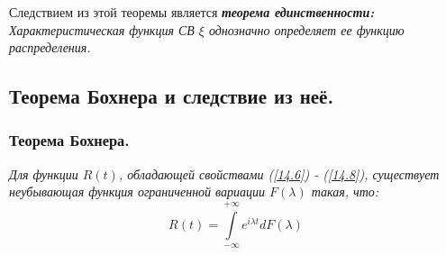     Следствием из этой теоремы является \textit{\textbf{теорема единственности:}}
      \textit{Характеристическая функция СВ $\xi$ однозначно определяет ее функцию распределения.}

  
    \subsection{Теорема Бохнера и следствие из неё.}
    \subsubsection{Теорема Бохнера.}

  \begin{theorem}\label{smd_theor_3} \textit{Для функции $R(t)$, обладающей свойствами (\ref{14.6}) - (\ref{14.8}), существует неубывающая функция ограниченной вариации $F(\lambda)$ такая, что:}
    \begin{equation}
    R(t)=\int\limits_{-\infty}^{+\infty} e^{i \lambda t} d F(\lambda)
    \label{14.11}
    \end{equation}
	\end{theorem}
    

